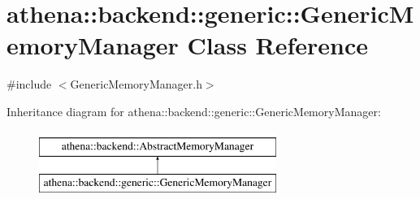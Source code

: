 \hypertarget{classathena_1_1backend_1_1generic_1_1_generic_memory_manager}{}\section{athena\+:\+:backend\+:\+:generic\+:\+:Generic\+Memory\+Manager Class Reference}
\label{classathena_1_1backend_1_1generic_1_1_generic_memory_manager}


{\ttfamily \#include $<$Generic\+Memory\+Manager.\+h$>$}

Inheritance diagram for athena\+:\+:backend\+:\+:generic\+:\+:Generic\+Memory\+Manager\+:\begin{figure}[H]
\begin{center}
\leavevmode
\includegraphics[height=2.000000cm]{d6/d21/classathena_1_1backend_1_1generic_1_1_generic_memory_manager}
\end{center}
\end{figure}

